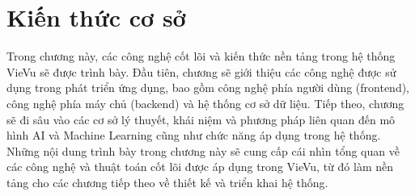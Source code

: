 \chapter{Kiến thức cơ sở}
Trong chương này, các công nghệ cốt lõi và kiến thức nền tảng trong hệ thống VieVu sẽ được trình bày. Đầu tiên, chương sẽ giới thiệu các công nghệ được sử dụng trong phát triển ứng dụng, bao gồm công nghệ phía người dùng (frontend), công nghệ phía máy chủ (backend) và hệ thống cơ sở dữ liệu.
Tiếp theo, chương sẽ đi sâu vào các cơ sở lý thuyết, khái niệm và phương pháp liên quan đến mô hình AI và Machine Learning cũng như chức năng áp dụng trong hệ thống.
Những nội dung trình bày trong chương này sẽ cung cấp cái nhìn tổng quan về các công nghệ và thuật toán cốt lõi được áp dụng trong VieVu, từ đó làm nền tảng cho các chương tiếp theo về thiết kế và triển khai hệ thống.




